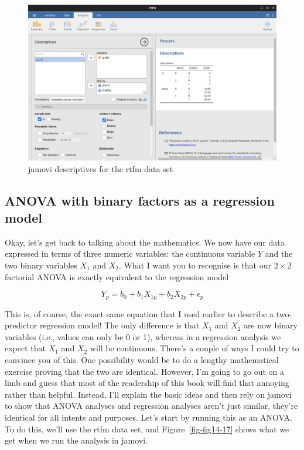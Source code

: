\documentclass[
  a4paper,
]{book}
\begin{document}
\begin{figure}

\includegraphics[width=1\textwidth,height=\textheight]{images/fig14-16.png} \hfill{}

\caption{\label{fig-fig14-16}jamovi descriptives for the rtfm data set}

\end{figure}

\hypertarget{anova-with-binary-factors-as-a-regression-model}{%
\subsection{ANOVA with binary factors as a regression
model}\label{anova-with-binary-factors-as-a-regression-model}}

Okay, let's get back to talking about the mathematics. We now have our
data expressed in terms of three numeric variables: the continuous
variable \(Y\) and the two binary variables \(X_1\) and \(X_2\). What I
want you to recognise is that our \(2 \times 2\) factorial ANOVA is
exactly equivalent to the regression model

\[Y_p=b_0+b_1 X_{1p} + b_2 X_{2p} + \epsilon_p\]

This is, of course, the exact same equation that I used earlier to
describe a two-predictor regression model! The only difference is that
\(X_1\) and \(X_2\) are now binary variables (i.e., values can only be 0
or 1), whereas in a regression analysis we expect that \(X_1\) and
\(X_2\) will be continuous. There's a couple of ways I could try to
convince you of this. One possibility would be to do a lengthy
mathematical exercise proving that the two are identical. However, I'm
going to go out on a limb and guess that most of the readership of this
book will find that annoying rather than helpful. Instead, I'll explain
the basic ideas and then rely on jamovi to show that ANOVA analyses and
regression analyses aren't just similar, they're identical for all
intents and purposes. Let's start by running this as an ANOVA. To do
this, we'll use the rtfm data set, and Figure~\ref{fig-fig14-17} shows
what we get when we run the analysis in jamovi.
\end{document}
